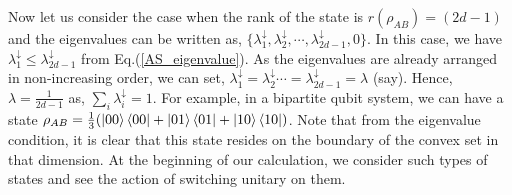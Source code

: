 \noindent Now let us consider the case when the rank of the state is $r(\rho_{AB})=(2d-1)$ and the eigenvalues can be written as, $\{\lambda_1^{\downarrow}, \lambda_2^{\downarrow}, \cdots, \lambda_{2d-1}^{\downarrow}, 0\}$. In this case, we have $\lambda_1^{\downarrow} \leq \lambda_{2d-1}^{\downarrow}$ from Eq.(\ref{AS_eigenvalue}). As the eigenvalues are already arranged in non-increasing order, we can set, $\lambda_1^{\downarrow}=\lambda_2^{\downarrow} \cdots= \lambda_{2d-1}^{\downarrow} = \lambda$ (say). Hence, $\lambda=\frac{1}{2d-1}$ as, $\sum_i \lambda_i^{\downarrow} =1$. For example, in a bipartite qubit system, we can have a state $\rho_{AB}=\frac{1}{3} (\ket{00}\bra{00}+\ket{01}\bra{01}+\ket{10}\bra{10})$. Note that from the eigenvalue condition, it is clear that this state resides on the boundary of the convex set in that dimension. At the beginning of our calculation, we consider such types of states and see the action of switching unitary on them. 
